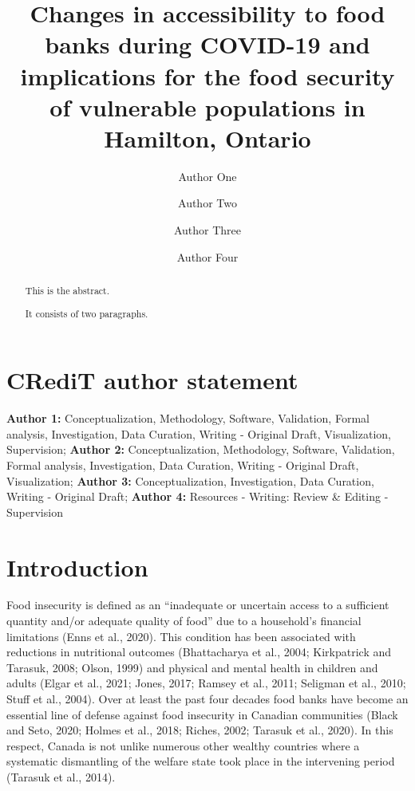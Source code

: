 \documentclass[]{elsarticle} %
\begin{document}
\begin{frontmatter}

  \title{Changes in accessibility to food banks during COVID-19 and
implications for the food security of vulnerable populations in
Hamilton, Ontario}
    \author[Some University]{Author One}
    \author[]{Author Two}
    \author[Some University]{Author Three}
    \author[Another University]{Author Four}
      \address[Some University]{Department, Street, City, State, Zip}
    \address[Another University]{Department, Street, City, State, Zip}
  
  \begin{abstract}
  This is the abstract.

  It consists of two paragraphs.
  \end{abstract}
  
 \end{frontmatter}

\hypertarget{credit-author-statement}{%
\section{CRediT author statement}\label{credit-author-statement}}

\textbf{Author 1:} Conceptualization, Methodology, Software, Validation,
Formal analysis, Investigation, Data Curation, Writing - Original Draft,
Visualization, Supervision; \textbf{Author 2:} Conceptualization,
Methodology, Software, Validation, Formal analysis, Investigation, Data
Curation, Writing - Original Draft, Visualization; \textbf{Author 3:}
Conceptualization, Investigation, Data Curation, Writing - Original
Draft; \textbf{Author 4:} Resources - Writing: Review \& Editing -
Supervision

\newpage

\hypertarget{introduction}{%
\section{Introduction}\label{introduction}}

Food insecurity is defined as an ``inadequate or uncertain access to a
sufficient quantity and/or adequate quality of food'' due to a
household's financial limitations (Enns et al., 2020). This condition
has been associated with reductions in nutritional outcomes
(Bhattacharya et al., 2004; Kirkpatrick and Tarasuk, 2008; Olson, 1999)
and physical and mental health in children and adults (Elgar et al.,
2021; Jones, 2017; Ramsey et al., 2011; Seligman et al., 2010; Stuff et
al., 2004). Over at least the past four decades food banks have become
an essential line of defense against food insecurity in Canadian
communities (Black and Seto, 2020; Holmes et al., 2018; Riches, 2002;
Tarasuk et al., 2020). In this respect, Canada is not unlike numerous
other wealthy countries where a systematic dismantling of the welfare
state took place in the intervening period (Tarasuk et al., 2014).
\end{document}
